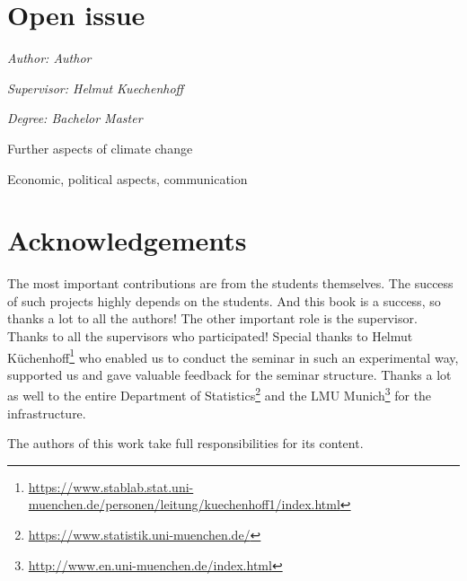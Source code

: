 \documentclass[
]{krantz}
\renewcommand{\href}[2]{#2\footnote{\url{#1}}}
\begin{document}
\chapter{Open issue}\label{open-issue}

\emph{Author: Author}

\emph{Supervisor: Helmut Kuechenhoff}

\emph{Degree: Bachelor Master }

Further aspects of climate change

Economic, political aspects, communication

\citet{campbell} \citet{sun}

\chapter{Acknowledgements}\label{acknowledgements}

The most important contributions are from the students themselves.
The success of such projects highly depends on the students.
And this book is a success, so thanks a lot to all the authors!
The other important role is the supervisor.
Thanks to all the supervisors who participated!
Special thanks to \href{https://www.stablab.stat.uni-muenchen.de/personen/leitung/kuechenhoff1/index.html}{Helmut Küchenhoff} who enabled us to conduct the seminar in such an experimental way, supported us and gave valuable feedback for the seminar structure.
Thanks a lot as well to the entire \href{https://www.statistik.uni-muenchen.de/}{Department of Statistics} and the \href{http://www.en.uni-muenchen.de/index.html}{LMU Munich} for the infrastructure.

The authors of this work take full responsibilities for its content.

  

\backmatter
\printindex
\end{document}
